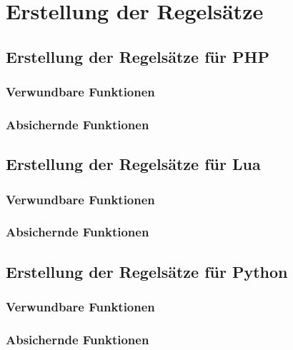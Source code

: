 \chapter{Erstellung der Regelsätze}

    \section{Erstellung der Regelsätze für PHP}

        \subsection{Verwundbare Funktionen}

        \subsection{Absichernde Funktionen}

    \section{Erstellung der Regelsätze für Lua}

        \subsection{Verwundbare Funktionen}

        \subsection{Absichernde Funktionen}

    \section{Erstellung der Regelsätze für Python}

        \subsection{Verwundbare Funktionen}

        \subsection{Absichernde Funktionen}
